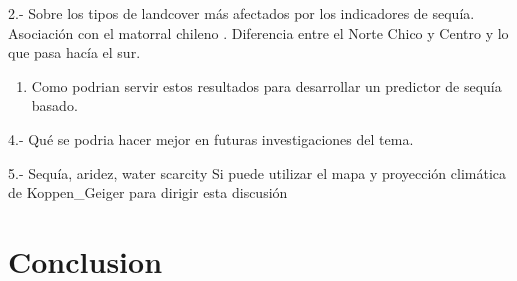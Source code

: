 \documentclass[
  authoryear,
  preprint,
  3p,
  onecolumn]{elsarticle}
\providecommand{\tightlist}{%
  \setlength{\itemsep}{0pt}\setlength{\parskip}{0pt}}\usepackage{longtable,booktabs,array}
\begin{document}
2.- Sobre los tipos de landcover más afectados por los indicadores de
sequía. Asociación con el matorral chileno \citep{Fuentes2021}.
Diferencia entre el Norte Chico y Centro y lo que pasa hacía el sur.

\begin{enumerate}
\def\labelenumi{\arabic{enumi}.}
\setcounter{enumi}{2}
\tightlist
\item
  Como podrian servir estos resultados para desarrollar un predictor de
  sequía basado.
\end{enumerate}

4.- Qué se podria hacer mejor en futuras investigaciones del tema.

5.- Sequía, aridez, water scarcity \citep{VanLoon2013} Si puede utilizar
el mapa y proyección climática de Koppen\_Geiger \citep{Beck2023} para
dirigir esta discusión

\hypertarget{conclusion}{%
\section{Conclusion}\label{conclusion}}

\newpage


\renewcommand\refname{References}
  
\end{document}
